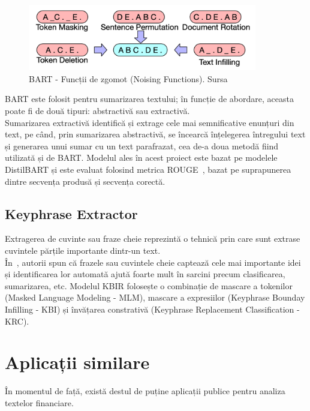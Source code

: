 \begin{figure}[H]
	\centering
	\includegraphics[width=100mm, scale=0.5]{figs/bartNoise.png}
    \caption{BART - Funcții de zgomot (Noising Functions). Sursa~\cite{BART}}
	\label{fig:bartNoise}
\end{figure}

BART este folosit pentru sumarizarea textului; în funcție de abordare, aceasta poate fi de două tipuri: abstractivă sau extractivă. \\
Sumarizarea extractivă identifică și extrage cele mai semnificative enunțuri din text, pe când, prin sumarizarea abstractivă,
se încearcă înțelegerea întregului text și generarea unui sumar cu un text parafrazat, cea de-a doua metodă fiind utilizată și de BART.
Modelul ales în acest proiect este bazat pe modelele DistilBART și este evaluat folosind metrica ROUGE~\cite{Rouge}, bazat pe suprapunerea dintre secvența produsă și secvența corectă. 
\subsection{Keyphrase Extractor}
Extragerea de cuvinte sau fraze cheie reprezintă o tehnică prin care sunt extrase cuvintele părțile importante dintr-un text. \\
În~\cite{KBIR}, autorii spun că frazele sau cuvintele cheie captează cele mai importante idei și identificarea lor automată ajută foarte mult în sarcini precum clasificarea, sumarizarea, etc.
Modelul KBIR folosește o combinație de mascare a tokenilor (Masked Language Modeling - MLM), mascare a expresiilor (Keyphrase Bounday Infilling - KBI) și învățarea constrativă (Keyphrase Replacement Classification - KRC).

\section{Aplicații similare}
În momentul de față, există destul de puține aplicații publice pentru analiza textelor financiare. 
